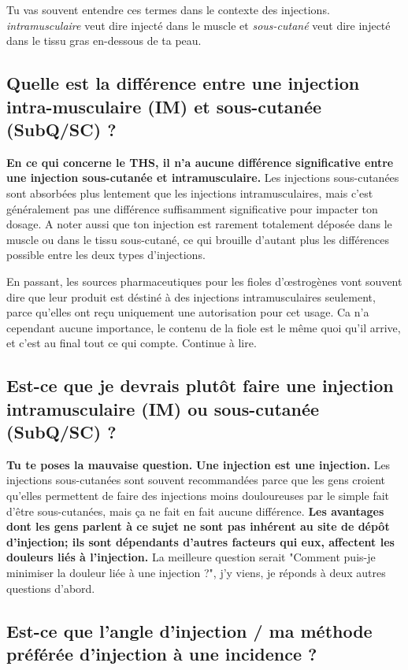\documentclass{article}
\begin{document}
Tu vas souvent entendre ces termes dans le contexte des injections. \textit{intramusculaire} veut dire injecté dans le muscle et \textit{sous-cutané} veut dire injecté dans le tissu gras en-dessous de ta peau.

\subsection{Quelle est la différence entre une injection intra-musculaire (IM) et sous-cutanée (SubQ/SC) ?}

\textbf{En ce qui concerne le THS, il n'a aucune différence significative entre une injection sous-cutanée et intramusculaire.} Les injections sous-cutanées sont absorbées plus lentement que les injections intramusculaires, mais c'est généralement pas une différence suffisamment significative pour impacter ton dosage. A noter aussi que ton injection est rarement totalement déposée dans le muscle ou dans le tissu sous-cutané, ce qui brouille d'autant plus les différences possible entre les deux types d'injections.

En passant, les sources pharmaceutiques pour les fioles d'œstrogènes vont souvent dire que leur produit est déstiné à des injections intramusculaires seulement, parce qu'elles ont reçu uniquement une autorisation pour cet usage. Ca n'a cependant aucune importance, le contenu de la fiole est le même quoi qu'il arrive, et c'est au final tout ce qui compte. Continue à lire.

\subsection{Est-ce que je devrais plutôt faire une injection intramusculaire (IM) ou  sous-cutanée (SubQ/SC) ?}

\textbf{Tu te poses la mauvaise question.} \textbf{Une injection est une injection.} Les injections sous-cutanées sont souvent recommandées parce que les gens croient qu'elles permettent de faire des injections moins douloureuses par le simple fait d'être sous-cutanées, mais ça ne fait en fait aucune différence. \textbf{Les avantages dont les gens parlent à ce sujet ne sont pas inhérent au site de dépôt d'injection; ils sont dépendants d'autres facteurs qui eux, affectent les douleurs liés à l'injection.} La meilleure question serait "Comment puis-je minimiser la douleur liée à une injection ?", j'y viens, je réponds à deux autres questions d'abord. 

\subsection{Est-ce que l'angle d'injection / ma méthode préférée d'injection à une incidence ?}
\end{document}
